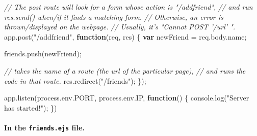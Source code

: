 \documentclass[11pt]{article}
\newenvironment{Shaded}{}{}
\newcommand{\KeywordTok}[1]{\textcolor[rgb]{0.00,0.44,0.13}{\textbf{{#1}}}}
\newcommand{\StringTok}[1]{\textcolor[rgb]{0.25,0.44,0.63}{{#1}}}
\newcommand{\CommentTok}[1]{\textcolor[rgb]{0.38,0.63,0.69}{\textit{{#1}}}}
\newcommand{\NormalTok}[1]{{#1}}
\newcommand{\VariableTok}[1]{\textcolor[rgb]{0.10,0.09,0.49}{{#1}}}
\newcommand{\OperatorTok}[1]{\textcolor[rgb]{0.40,0.40,0.40}{{#1}}}
\newcommand{\AttributeTok}[1]{\textcolor[rgb]{0.49,0.56,0.16}{{#1}}}
\begin{document}
\begin{Shaded}
\begin{Highlighting}[]
\CommentTok{// The post route will look for a form whose action is "/addfriend",}
\CommentTok{//   and run res.send() when/if it finds a matching form.}
\CommentTok{// Otherwise, an error is thrown/displayed on the webpage.}
\CommentTok{//   Usually, it's "Cannot POST '/url' ".}
\VariableTok{app}\NormalTok{.}\AttributeTok{post}\NormalTok{(}\StringTok{"/addfriend"}\OperatorTok{,} \KeywordTok{function}\NormalTok{(req}\OperatorTok{,}\NormalTok{ res) }\OperatorTok{\{}
  \KeywordTok{var}\NormalTok{ newFriend }\OperatorTok{=} \VariableTok{req}\NormalTok{.}\VariableTok{body}\NormalTok{.}\AttributeTok{name}\OperatorTok{;}
  
  \VariableTok{friends}\NormalTok{.}\AttributeTok{push}\NormalTok{(newFriend)}\OperatorTok{;}
  
  \CommentTok{// takes the name of a route (the url of the particular page),}
  \CommentTok{//  and runs the code in that route.}
  \VariableTok{res}\NormalTok{.}\AttributeTok{redirect}\NormalTok{(}\StringTok{"/friends"}\NormalTok{)}\OperatorTok{;}
\OperatorTok{\}}\NormalTok{)}\OperatorTok{;}

\VariableTok{app}\NormalTok{.}\AttributeTok{listen}\NormalTok{(}\VariableTok{process}\NormalTok{.}\VariableTok{env}\NormalTok{.}\AttributeTok{PORT}\OperatorTok{,} \VariableTok{process}\NormalTok{.}\VariableTok{env}\NormalTok{.}\AttributeTok{IP}\OperatorTok{,} \KeywordTok{function}\NormalTok{() }\OperatorTok{\{}
  \VariableTok{console}\NormalTok{.}\AttributeTok{log}\NormalTok{(}\StringTok{"Server has started!"}\NormalTok{)}\OperatorTok{;}
\OperatorTok{\}}\NormalTok{)}
\end{Highlighting}
\end{Shaded}

\hypertarget{in-the-friends.ejs-file.}{%
\paragraph{\texorpdfstring{In the \texttt{friends.ejs}
file.}{In the friends.ejs file.}}\label{in-the-friends.ejs-file.}}
\end{document}
